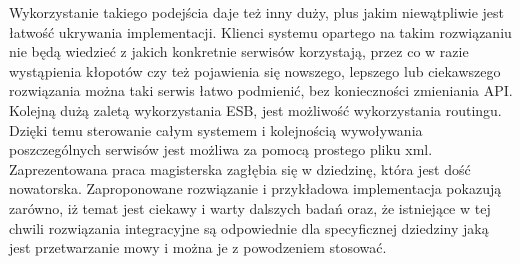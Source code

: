 Wykorzystanie takiego podejścia daje też inny duży, plus jakim niewątpliwie jest łatwość ukrywania implementacji. Klienci systemu opartego na takim rozwiązaniu nie będą wiedzieć z jakich konkretnie serwisów korzystają, przez co w razie wystąpienia kłopotów czy też pojawienia się nowszego, lepszego lub ciekawszego rozwiązania można taki serwis łatwo podmienić, bez konieczności zmieniania API. Kolejną dużą zaletą wykorzystania ESB, jest możliwość wykorzystania routingu. Dzięki temu sterowanie całym systemem i kolejnością wywoływania poszczególnych serwisów jest możliwa za pomocą prostego pliku xml.  \\
Zaprezentowana praca magisterska zagłębia się w dziedzinę, która jest dość nowatorska. Zaproponowane rozwiązanie i przykładowa implementacja pokazują zarówno, iż temat jest ciekawy i warty dalszych badań oraz, że istniejące w tej chwili rozwiązania integracyjne są odpowiednie dla specyficznej dziedziny jaką jest przetwarzanie mowy i można je z powodzeniem stosować. 







